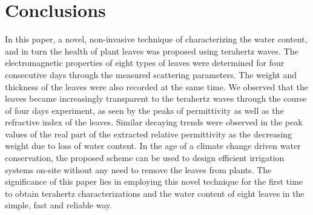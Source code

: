 \documentclass[journal,article,submit,moreauthors,pdftex]{Definitions/mdpi}
\renewcommand{\^}{\hat}  %
\begin{document}
\section{Conclusions}
\label{sec:conclusion}
%

In this paper, a novel, non-invasive technique of characterizing the water content, and in turn the health of plant leaves was proposed using terahertz waves. The electromagnetic properties of eight types of leaves were determined for four consecutive days through the measured scattering parameters. The weight and thickness of the leaves were also recorded at the same time. We observed that the leaves became increasingly transparent to the terahertz waves through the course of four days experiment, as seen by the peaks of permittivity as well as the refractive index of the leaves. Similar decaying trends were observed in the peak values of the real part of the extracted relative permittivity as the decreasing weight due to loss of water content. In the age of a climate change driven water conservation, the proposed scheme can be used to design efficient irrigation systems on-site without any need to remove the leaves from plants. The significance of this paper lies in employing this novel technique for the first time to obtain terahertz characterizations and the water content of eight leaves in the simple, fast and reliable way.
\end{document}
